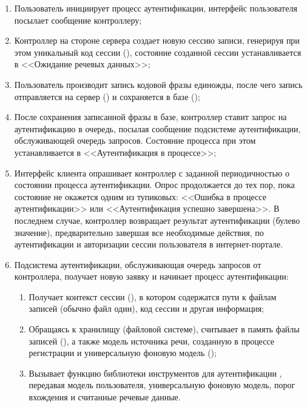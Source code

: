 \begin{enumerate}
\item Пользователь инициирует процесс аутентификации, интерфейс пользователя
посылает сообщение  контроллеру;
\item Контроллер на стороне сервера создает новую сессию записи, генерируя при
этом уникальный код сессии (), состояние
созданной сессии устанавливается в <<Ожидание речевых данных>>;
\item Пользователь производит запись кодовой фразы единожды, после чего запись
отправляется на сервер () и сохраняется в базе
();
\item После сохранения записанной фразы в базе, контроллер ставит запрос на
аутентификацию в очередь, посылая сообщение 
подсистеме аутентификации, обслуживающей очередь запросов. Состояние процесса
при этом устанавливается в <<Аутентификация в процессе>>;
\item Интерфейс клиента опрашивает контроллер с заданной периодичностью о
состоянии процесса аутентификации. Опрос продолжается до тех пор, пока состояние
не окажется одним из тупиковых: <<Ошибка в процессе аутентификации>> или
<<Аутентификация успешно завершена>>. В последнем случае, контроллер возвращает
результат аутентификации (булево значение), предварительно завершая все
необходимые действия, по аутентификации и авторизации сессии пользователя в
интернет-портале.
\item \label{enum:verificate} Подсистема аутентификации, обслуживающая очередь
запросов от контроллера, получает новую заявку и начинает процесс аутентификации:
    \begin{enumerate}
        \item Получает контекст сессии (), в котором
        содержатся пути к файлам записей (обычно файл один), код сессии и другая
        информация;
        \item Обращаясь к хранилищу (файловой системе), считывает в память файлы
        записей (), а также модель источника речи, созданную в
        процессе регистрации и универсальную фоновую модель ();
        \item Вызывает функцию библиотеки инструментов для аутентификации
        , передавая модель пользователя, универсальную фоновую
        модель, порог вхождения и считанные речевые данные.
    \end{enumerate}
\end{enumerate}

